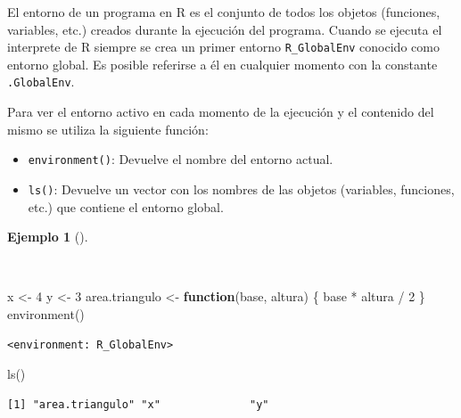 \documentclass[
  spanish,
  a4paper,
]{scrreport}
\newenvironment{Shaded}{\begin{snugshade}}{\end{snugshade}}
\newcommand{\ControlFlowTok}[1]{\textcolor[rgb]{0.00,0.23,0.31}{\textbf{#1}}}
\newcommand{\DecValTok}[1]{\textcolor[rgb]{0.68,0.00,0.00}{#1}}
\newcommand{\FunctionTok}[1]{\textcolor[rgb]{0.28,0.35,0.67}{#1}}
\newcommand{\NormalTok}[1]{\textcolor[rgb]{0.00,0.23,0.31}{#1}}
\newcommand{\OtherTok}[1]{\textcolor[rgb]{0.00,0.23,0.31}{#1}}
\newcommand{\SpecialCharTok}[1]{\textcolor[rgb]{0.37,0.37,0.37}{#1}}
\providecommand{\tightlist}{%
  \setlength{\itemsep}{0pt}\setlength{\parskip}{0pt}}
\theoremstyle{definition}
\theoremstyle{definition}
\newtheorem{example}{Ejemplo}[chapter]
\theoremstyle{remark}
\begin{document}
El entorno de un programa en R es el conjunto de todos los objetos
(funciones, variables, etc.) creados durante la ejecución del programa.
Cuando se ejecuta el interprete de R siempre se crea un primer entorno
\texttt{R\_GlobalEnv} conocido como entorno global. Es posible referirse
a él en cualquier momento con la constante \texttt{.GlobalEnv}.

Para ver el entorno activo en cada momento de la ejecución y el
contenido del mismo se utiliza la siguiente función:

\begin{itemize}
\tightlist
\item
  \texttt{environment()}: Devuelve el nombre del entorno actual.
\item
  \texttt{ls()}: Devuelve un vector con los nombres de las objetos
  (variables, funciones, etc.) que contiene el entorno global.
\end{itemize}

\begin{example}[]\protect\hypertarget{exm-acceso-entorno-global}{}\label{exm-acceso-entorno-global}

~

\begin{Shaded}
\begin{Highlighting}[]
\NormalTok{x }\OtherTok{\textless{}{-}} \DecValTok{4}
\NormalTok{y }\OtherTok{\textless{}{-}} \DecValTok{3}
\NormalTok{area.triangulo }\OtherTok{\textless{}{-}} \ControlFlowTok{function}\NormalTok{(base, altura) \{}
\NormalTok{  base }\SpecialCharTok{*}\NormalTok{ altura }\SpecialCharTok{/} \DecValTok{2}
\NormalTok{\}}
\FunctionTok{environment}\NormalTok{()}
\end{Highlighting}
\end{Shaded}

\begin{verbatim}
<environment: R_GlobalEnv>
\end{verbatim}

\begin{Shaded}
\begin{Highlighting}[]
\FunctionTok{ls}\NormalTok{()}
\end{Highlighting}
\end{Shaded}

\begin{verbatim}
[1] "area.triangulo" "x"              "y"             
\end{verbatim}

\end{example}
\end{document}
